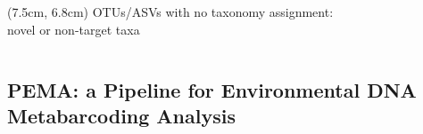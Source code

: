 \documentclass{beamer}
\begin{document}
\begin{frame}
\begin{columns}[onlytextwidth]
            \begin{textblock*}{5cm}(7.5cm, 6.8cm)
               \footnotesize OTUs/ASVs with no taxonomy assignment: \\ 
               \footnotesize novel or non-target taxa
            \end{textblock*}
   
      \end{columns}



   \end{frame}


   \begin{darkframes}
      \subsection{PEMA: a Pipeline for Environmental DNA Metabarcoding Analysis}
   \end{darkframes}
   
\end{document}
